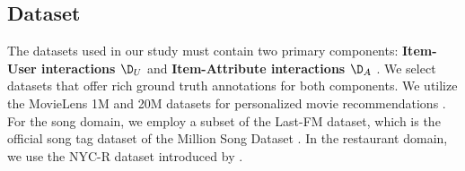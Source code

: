 \subsection{Dataset}
\label{sec:dataset}
\vspace{-5pt}
The datasets used in our study must contain two primary components: \textbf{Item-User interactions $\D_U$} and \textbf{Item-Attribute interactions $\D_A$} . We select datasets that offer rich ground truth annotations for both components. We utilize the MovieLens 1M and 20M datasets for personalized movie recommendations \citep{harper:2015}. For the song domain, we employ a subset of the Last-FM dataset, which is the official song tag dataset of the Million Song Dataset \citep{lastfm}. In the restaurant domain, we use the NYC-R dataset introduced by \cite{nycr}.


